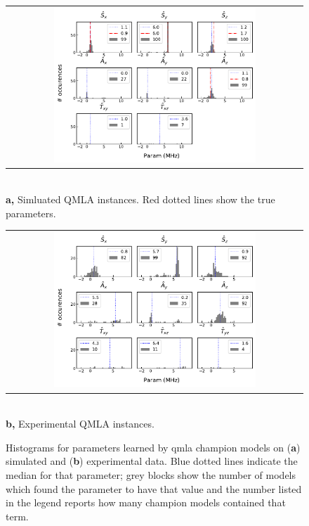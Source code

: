 \begin{figure}
    \centering
    \begin{tabular}{@{}c@{}}
        \centering
        \includegraphics[width=0.7\textwidth]{experimental_study/figures/params_simulation.pdf}
    \end{tabular}
    \\ \small \textbf{a,} Simluated QMLA instances. Red dotted lines show the true parameters.
    
    \centering
    \begin{tabular}{@{}c@{}}
        \centering
        \includegraphics[width=0.7\textwidth]{experimental_study/figures/params_experimental.pdf}
    \end{tabular}
    \\
    \small \textbf{b,} Experimental QMLA instances.
    \caption[
        Histograms for parameters learned by \gls{qmla} \glspl{champion model} on simulated and experimental data
    ]{
        Histograms for parameters learned by \gls{qmla} \glspl{champion model} on (\textbf{a}) simulated  and (\textbf{b}) experimental data. 
        Blue dotted lines indicate the median for that parameter; grey blocks show the number of models which found the parameter
        to have that value and the number listed in the legend reports how many \glspl{champion model} contained that term.
        \figtableref
    }
    \label{fig:nv_learned_params}
\end{figure}

